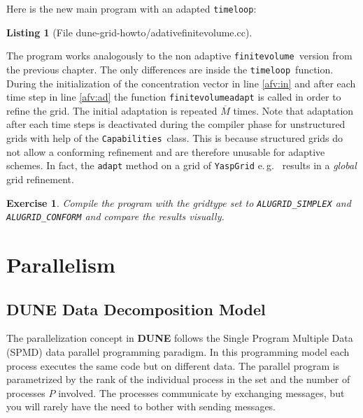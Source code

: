 \documentclass[11pt,a4paper,headinclude,footinclude,DIV16,normalheadings]{scrreprt}
\newcommand{\Dune}{{\sf\bfseries DUNE}\xspace}
\newtheorem{exc}{Exercise}[chapter]
\newtheorem{lst}{Listing}
\begin{document}
Here is the new main program with an adapted \lstinline!timeloop!:

\begin{lst}[File dune-grid-howto/adativefinitevolume.cc] \mbox{}
\nopagebreak

\end{lst}

The program works analogously to the non adaptive \lstinline!finitevolume!\
version from the previous chapter. The only differences are inside the
\lstinline!timeloop!\ function. During the initialization of the concentration
vector in line \ref{afv:in} and after each time step in line \ref{afv:ad} the
function \lstinline!finitevolumeadapt! is called in order to refine the grid.
The initial adaptation is repeated $\overline{M}$ times.  Note that adaptation
after each time steps is deactivated during the compiler phase for unstructured
grids with help of the \lstinline!Capabilities!\ class. This is because
structured grids do not allow a conforming refinement and are therefore
unusable for adaptive schemes. In fact, the \lstinline!adapt! method on a grid
of \lstinline!YaspGrid! e.\,g.~ results in a {\em global} grid refinement.

\begin{exc}
  Compile the program with the gridtype set to \lstinline!ALUGRID_SIMPLEX!
  and \lstinline!ALUGRID_CONFORM! and compare the results visually.  
\end{exc}

\chapter{Parallelism}

\section{\texorpdfstring{\Dune{}}{DUNE} Data Decomposition Model}

The parallelization concept in \Dune{} follows the Single Program
Multiple Data (SPMD) data parallel programming paradigm. In this
programming model each process executes the same code but on different
data. The parallel program is parametrized
by the rank of the individual process in the set and the number of
processes $P$
involved. The processes communicate by exchanging messages, but you
will rarely have the need to bother with sending messages.
\end{document}
